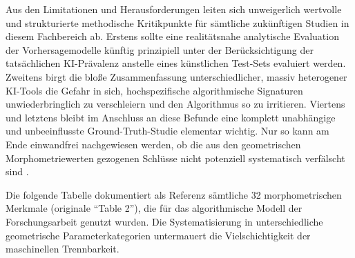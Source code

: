 \documentclass[12pt,twoside=false,a4paper,parskip]{scrbook}
\begin{document}
Aus den Limitationen und Herausforderungen leiten sich unweigerlich wertvolle und strukturierte methodische Kritikpunkte für sämtliche zukünftigen Studien in diesem Fachbereich ab. Erstens sollte eine realitätsnahe analytische Evaluation der Vorhersagemodelle künftig prinzipiell unter der Berücksichtigung der tatsächlichen KI-Prävalenz anstelle eines künstlichen Test-Sets evaluiert werden. Zweitens birgt die bloße Zusammenfassung unterschiedlicher, massiv heterogener KI-Tools die Gefahr in sich, hochspezifische algorithmische Signaturen unwiederbringlich zu verschleiern und den Algorithmus so zu irritieren. Viertens und letztens bleibt im Anschluss an diese Befunde eine komplett unabhängige und unbeeinflusste Ground-Truth-Studie elementar wichtig. Nur so kann am Ende einwandfrei nachgewiesen werden, ob die aus den geometrischen Morphometriewerten gezogenen Schlüsse nicht potenziell systematisch verfälscht sind \cite[S.~20--21]{memduhoglu2026ml}.


\backmatter

\listoffigures
{}



\appendix
{}

 \label{appendix:merkmale}

Die folgende Tabelle dokumentiert als Referenz sämtliche 32 morphometrischen Merkmale (originale \enquote{Table 2}), die für das algorithmische Modell der Forschungsarbeit genutzt wurden. Die Systematisierung in unterschiedliche geometrische Parameterkategorien untermauert die Vielschichtigkeit der maschinellen Trennbarkeit.
\end{document}
